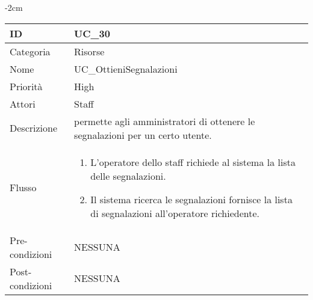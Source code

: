 \begin{center}
\begin{table}[bp]
    \centering
    \addtolength{\leftskip} {-2cm}
\begin{tabular}{ |p{2.6cm}|p{13cm}|  }
\hline
ID & UC\_30 \\\hline
Categoria & Risorse\\\hline
Nome & UC\_OttieniSegnalazioni\\\hline
Priorità & High \\\hline
Attori &  Staff \\\hline
Descrizione & permette agli amministratori di ottenere le segnalazioni per un certo utente.\\\hline
Flusso &  	\begin{enumerate}
			\item L'operatore dello staff richiede al sistema la lista delle segnalazioni.
			\item Il sistema ricerca le segnalazioni fornisce la lista di segnalazioni all'operatore richiedente.
			\end{enumerate}
			\\\hline
Pre-condizioni & NESSUNA\\\hline
Post-condizioni & NESSUNA\\\hline
\end{tabular}
\label{table_use_case:30}\newline
\end{table}


\end{center}
